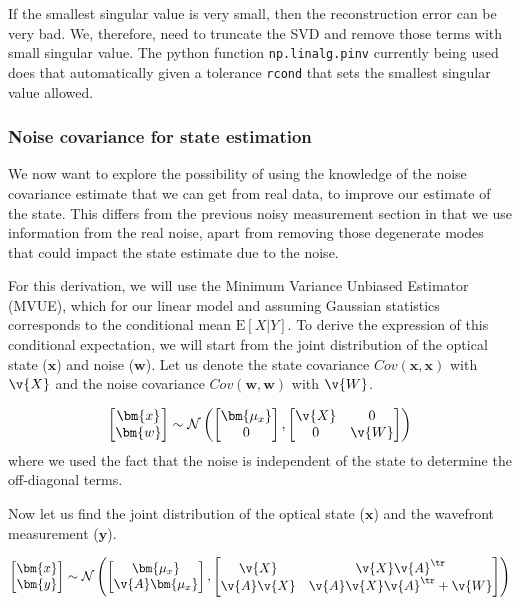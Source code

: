 \documentclass[SE,authoryear,toc]{lsstdoc}
\begin{document}
If the smallest singular value is very small, then the reconstruction error can be very bad. We, therefore, need to truncate the SVD and remove those terms with small singular value. The python function \texttt{np.linalg.pinv} currently being used does that automatically given a tolerance \texttt{rcond} that sets the smallest singular value allowed.
\subsubsection*{Noise covariance for state estimation}
We now want to explore the possibility of using the knowledge of the noise covariance estimate that we can get from real data, to improve our estimate of the state. This differs from the previous noisy measurement section in that we use information from the real noise, apart from removing those degenerate modes that could impact the state estimate due to the noise. 

For this derivation, we will use the Minimum Variance Unbiased Estimator (MVUE), which for our linear model and assuming Gaussian statistics corresponds to the conditional mean $\mathrm{E}[X | Y]$. To derive the expression of this conditional expectation, we will start from the joint distribution of the optical state ($\bm{x}$) and noise ($\bm{w}$). Let us denote the state covariance $Cov(\bm{x}, \bm{x})$ with  $\v{X}$ and the noise covariance $Cov(\bm{w}, \bm{w})$ with $\v{W}$.  

\begin{equation}
    \begin{bmatrix}
        \bm{x} \\
        \bm{w}
    \end{bmatrix}
    \sim \mathcal{N} \left(
    \begin{bmatrix}
        \bm{\mu_x} \\
        0
    \end{bmatrix},
    \begin{bmatrix}
        \v{X} & 0 \\
        0 & \v{W}
    \end{bmatrix}
    \right) 
\end{equation}
where we used the fact that the noise is independent of the state to determine the off-diagonal terms.

Now let us find the joint distribution of the optical state ($\bm{x}$) and the wavefront measurement ($\bm{y}$). 

\begin{equation}
    \begin{bmatrix}
        \bm{x} \\
        \bm{y}
    \end{bmatrix}
    \sim \mathcal{N} \left(
    \begin{bmatrix}
        \bm{\mu_x} \\
        \v{A}\bm{\mu_x}
    \end{bmatrix},
    \begin{bmatrix}
        \v{X} & \v{X}\v{A}^{\tr} \\
        \v{A}\v{X} & \v{A}\v{X}\v{A}^{\tr} + \v{W}
    \end{bmatrix}
    \right) 
\end{equation}
\end{document}
